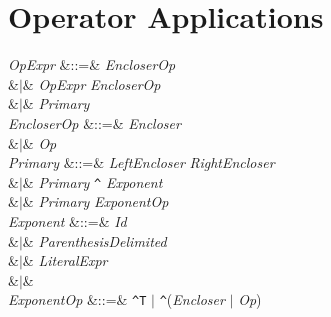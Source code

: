 %
%
%
%

\section{Operator Applications}


\begin{Grammar}
\emph{OpExpr}
&::=& \emph{EncloserOp}   \\
&$|$& \emph{OpExpr} \emph{EncloserOp}  \\
&$|$& \emph{Primary}\\

\emph{EncloserOp} &::=& \emph{Encloser}\\
&$|$& \emph{Op}\\

\emph{Primary}
&::=& \emph{LeftEncloser}   \emph{RightEncloser} \\
&$|$& \emph{Primary} \verb+^+ \emph{Exponent}\\
&$|$& \emph{Primary} \emph{ExponentOp}\\

\emph{Exponent}
&::=& \emph{Id}\\
&$|$& \emph{ParenthesisDelimited}\\
&$|$& \emph{LiteralExpr}\\
&$|$& \\

\emph{ExponentOp} &::=& \verb+^T+ $|$ \verb+^+(\emph{Encloser} $|$ \emph{Op})\\

\end{Grammar}

